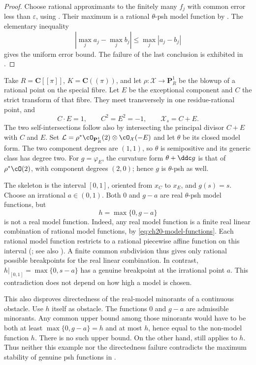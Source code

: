 \begin{proof}
Choose rational approximants to the finitely many \(f_j\) with common
error less than \(\varepsilon\), using
.  Their maximum is a
rational \(\theta\)-psh model function by .
The elementary inequality
\[
 \left|\max_j a_j-\max_j b_j\right|\leq\max_j|a_j-b_j|
\]
gives the uniform error bound.  The failure of the last conclusion is
exhibited in .
\end{proof}

\begin{example}
\label{ex:ch20-real-max-irrational-breakpoint}
Take \(R=\mathbf C[[\pi]]\), \(K=\mathbf C((\pi))\), and let
\(\rho:\mathcal X\to\mathbf P^1_R\) be the blowup of a rational point
on the special fibre.  Let \(E\) be the exceptional component and \(C\)
the strict transform of that fibre.  They meet transversely in one
residue-rational point, and
\[
 C\cdot E=1,\qquad C^2=E^2=-1,\qquad \mathcal X_s=C+E.
\]
The two self-intersections follow also by intersecting the principal
divisor \(C+E\) with \(C\) and \(E\).  Set
\(\mathcal L=\rho^*\cO_{\mathbf P^1_R}(2)\otimes\cO_{\mathcal X}(-E)\)
and let \(\theta\) be its closed model form.  The two component degrees
are \((1,1)\), so \(\theta\) is semipositive and its generic class has
degree two.  For \(g=\varphi_E\), the curvature form
\(\theta+\ddc g\) is that of \(\rho^*\cO(2)\), with component degrees
\((2,0)\); hence \(g\) is \(\theta\)-psh as well.

The skeleton is the interval \([0,1]\), oriented from \(x_C\) to
\(x_E\), and \(g(s)=s\).  Choose an irrational \(a\in(0,1)\).
Both \(0\) and \(g-a\) are real \(\theta\)-psh model functions, but
\[
                    h=\max\{0,g-a\}
\]
is not a real model function.  Indeed, any real model function is a
finite real linear combination of rational model functions, by
\eqref{eq:ch20-model-functions}.  Each rational model function restricts
to a rational piecewise affine function on this interval
(; see also
\cite[Proposition 3.12 and Corollary 3.13]{BFJ16}).  A finite common
subdivision thus gives only rational possible breakpoints for the real
linear combination.  In contrast, \(h|_{[0,1]}=\max\{0,s-a\}\) has a
genuine breakpoint at the irrational point \(a\).  This contradiction
does not depend on how high a model is chosen.

This also disproves directedness of the real-model minorants of a
continuous obstacle.  Use \(h\) itself as obstacle.  The functions
\(0\) and \(g-a\) are admissible minorants.  Any common upper bound
among those minorants would have to be both at least
\(\max\{0,g-a\}=h\) and at most \(h\), hence equal to the non-model
function \(h\).  There is no such upper bound.  On the other hand,
 still applies to \(h\).
Thus neither this example nor the directedness failure contradicts the
maximum stability of genuine psh functions in
.
\end{example}

